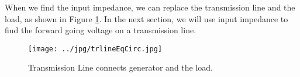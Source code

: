 \documentclass{ximera}
\begin{document}
When we find the input impedance, we can replace the transmission line and the load, as shown in Figure \ref{fig:IITRLineEqCirc}. In the next section, we will use input impedance to find the forward going voltage on a transmission line.

\begin{figure}[htbp]
\begin{center}
\texttt{[image: ../jpg/trlineEqCirc.jpg]}
\end{center}
\caption{Transmission Line connects generator and the load.}
\label{fig:IITRLineEqCirc}
\end{figure}
\end{document}
